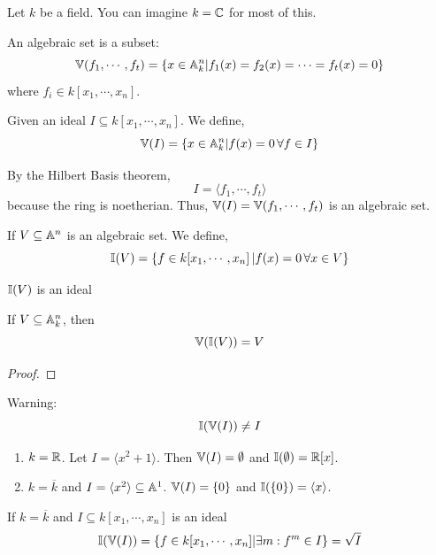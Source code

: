 \documentclass[12pt]{amsart}
\begin{document}
Let $k$ be a field. You can imagine $k = \mathbb C$ for most of this. 
\begin{definition}
    An algebraic set is a subset: 
    \[ \mathbb V(f_1, \cdots, f_t) = \{ x \in \mathbb A^n_k | f_1(x) = f_2(x) = \cdots = f_t(x) = 0 \}\]
    where $f_i \in k[x_1, \cdots, x_n]$. 
\end{definition}

Given an ideal $I \subseteq k[x_1, \cdots, x_n]$. We define, 
\[ \mathbb V(I) = \{ x \in \mathbb A^n_k | f(x) = 0 \, \forall f \in I\}\]
\begin{remark}
    By the Hilbert Basis theorem,
    \[ I = \langle f_1, \cdots, f_t\rangle\]
    because the ring is noetherian. Thus, $\mathbb V(I) = \mathbb V(f_1, \cdots, f_t)$ is an algebraic set. 
\end{remark}

\begin{definition}
    If $V \subseteq \mathbb A^n$ is an algebraic set. We define, 
    \[ \mathbb I(V) = \{ f \in k[x_1, \cdots, x_n] \, | f(x) = 0 \, \forall x \in V\} \]
\end{definition}

\begin{lemma}
    $\mathbb I(V)$ is an ideal
\end{lemma}

\begin{lemma}
    If $V \subseteq \mathbb A^n_k$, then 
    \[ \mathbb V(\mathbb I(V)) = V\] 
\end{lemma}
\begin{proof}
\end{proof}

Warning: 
\[ \mathbb I(\mathbb V(I)) \neq I\]

\begin{example}
    \begin{enumerate}
        \item $k = \mathbb R$. Let $I = \langle x^2 + 1\rangle$. Then $\mathbb V(I) = \emptyset$ and $\mathbb I(\emptyset) = \mathbb R[x]$. 
        \item $k = \overline{k}$ and $I = \langle x^2 \rangle \subseteq \mathbb A^1$. $\mathbb V(I) = \{0\}$ and $\mathbb I(\{0\}) = \langle x \rangle$. 
    \end{enumerate}    
\end{example}

\begin{proposition}
    If $k = \overline k$ and $I \subseteq k[x_1, \cdots, x_n]$ is an ideal 
    \[ \mathbb I(\mathbb V(I)) = \{f \in k[x_1, \cdots, x_n] | \exists m : f^m \in I \} = \sqrt{I}\]
\end{proposition}
\end{document}
